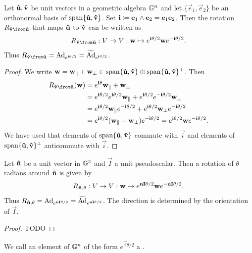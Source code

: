 \begin{proposition}
Let $\boldsymbol{\mathrm{\hat{u}}}, \boldsymbol{\mathrm{\hat{v}}}$ be unit vectors in a geometric algebra $\mathbb{G}^n$ and let $\{\vec{e}_1, \vec{e}_2\}$ be an orthonormal basis of $\operatorname{span}\{\boldsymbol{\mathrm{\hat{u}}},\boldsymbol{\mathrm{\hat{v}}}\}$. Set $\boldsymbol{\mathrm{i}} \coloneqq \boldsymbol{\mathrm{e}}_1\wedge \boldsymbol{\mathrm{e}}_2 = \boldsymbol{\mathrm{e}}_1\boldsymbol{\mathrm{e}}_2$. Then the rotation $R_{\vhat{v}\from\vhat{u}}$ that maps $\boldsymbol{\mathrm{\hat{u}}}$ to $\boldsymbol{\mathrm{\hat{v}}}$ can be written as
\[ R_{\vhat{v}\from\vhat{u}}: V \to V: \vec{w} \mapsto e^{\vec{i}\theta/2}\vec{w}e^{-\vec{i}\theta/2}. \]
Thus $R_{\vhat{v}\from\vhat{u}} = \Ad_{e^{\vec{i}\theta/2}} = \widetilde{\Ad}_{e^{\vec{i}\theta/2}}$.
\end{proposition}
\begin{proof}
We write $\boldsymbol{\mathrm{w}} = \boldsymbol{\mathrm{w}}_\parallel + \boldsymbol{\mathrm{w}}_\perp \in \operatorname{span}\{\boldsymbol{\mathrm{\hat{u}}},\boldsymbol{\mathrm{\hat{v}}}\} \oplus \operatorname{span}\{\boldsymbol{\mathrm{\hat{u}}},\boldsymbol{\mathrm{\hat{v}}}\}^\perp$.
Then
\begin{align*}
R_{\vhat{v}\from\vhat{u}}(\vec{w}) &= e^{\vec{i}\theta}\vec{w}_\parallel + \vec{w}_\perp \\
&= e^{\vec{i}\theta/2}e^{\vec{i}\theta/2}\vec{w}_\parallel + e^{\vec{i}\theta/2}e^{-\vec{i}\theta/2}\vec{w}_\perp \\
&= e^{\vec{i}\theta/2}\vec{w}_\parallel e^{-\vec{i}\theta/2} + e^{\vec{i}\theta/2}\vec{w}_\perp e^{-\vec{i}\theta/2} \\
&= e^{\vec{i}\theta/2}(\vec{w}_\parallel + \vec{w}_\perp) e^{-\vec{i}\theta/2} = e^{\vec{i}\theta/2}\vec{w} e^{-\vec{i}\theta/2}.
\end{align*}
We have used that elements of $\operatorname{span}\{\boldsymbol{\mathrm{\hat{u}}},\boldsymbol{\mathrm{\hat{v}}}\}$ commute with $\vec{i}$ and elements of $\operatorname{span}\{\boldsymbol{\mathrm{\hat{u}}},\boldsymbol{\mathrm{\hat{v}}}\}^\perp$ anticommute with $\vec{i}$.
\end{proof}
\begin{corollary}
Let $\boldsymbol{\mathrm{\hat{n}}}$ be a unit vector in $\mathbb{G}^3$ and $\vec{I}$ a unit pseudoscalar. Then a rotation of $\theta$ radians around $\boldsymbol{\mathrm{\hat{n}}}$ is given by
\[ R_{\boldsymbol{\mathrm{\hat{n}}},\theta}: V \to V: \boldsymbol{\mathrm{w}} \mapsto e^{\boldsymbol{\mathrm{n}}\boldsymbol{\mathrm{I}}\theta/2}\boldsymbol{\mathrm{w}}e^{-\boldsymbol{\mathrm{n}}\boldsymbol{\mathrm{I}}\theta/2}. \]
Thus $R_{\boldsymbol{\mathrm{\hat{n}}},\theta} = \operatorname{Ad}_{e^{\boldsymbol{\mathrm{n}}\boldsymbol{\mathrm{I}}\theta/2}} = \widetilde{\operatorname{Ad}}_{e^{\boldsymbol{\mathrm{n}}\boldsymbol{\mathrm{I}}\theta/2}}$. The direction is determined by the orientation of $\vec{I}$.
\end{corollary}
\begin{proof}
TODO
\end{proof}

\begin{definition}
We call an element of $\mathbb{G}^n$ of the form $e^{\vec{i}\theta/2}$ a .
\end{definition}

